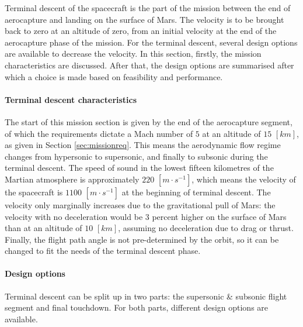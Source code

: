 Terminal descent of the spacecraft is the part of the mission between the end of aerocapture and landing on the surface of Mars. The velocity is to be brought back to zero at an altitude of zero, from an initial velocity at the end of the aerocapture phase of the mission. For the terminal descent, several design options are available to decrease the velocity. In this section, firstly, the mission characteristics are discussed. After that, the design options are summarised after which a choice is made based on feasibility and performance.

\paragraph{Terminal descent characteristics}
The start of this mission section is given by the end of the aerocapture segment, of which the requirements dictate a Mach number of $5$ at an altitude of $15$ $[km]$, as given in Section \ref{sec:missionreq}. This means the aerodynamic flow regime changes from hypersonic to supersonic, and finally to subsonic during the terminal descent. The speed of sound in the lowest fifteen kilometres of the Martian atmosphere is approximately $220$ $[m\cdot s^{-1}]$, which means the velocity of the spacecraft is $1100$ $[m\cdot s^{-1}]$ at the beginning of terminal descent. The velocity only marginally increases due to the gravitational pull of Mars: the velocity with no deceleration would be 3 percent higher on the surface of Mars than at an altitude of $10$ $[km]$, assuming no deceleration due to drag or thrust. Finally, the flight path angle is not pre-determined by the orbit, so it can be changed to fit the needs of the terminal descent phase.

\paragraph{Design options}
Terminal descent can be split up in two parts: the supersonic \& subsonic flight segment and final touchdown. For both parts, different design options are available.

